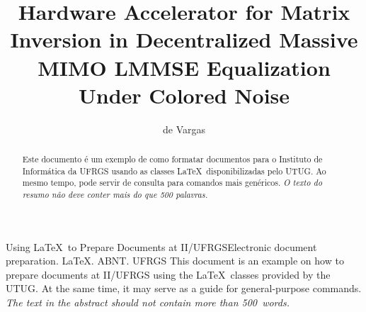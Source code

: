 \documentclass[ecp,tc,english]{iiufrgs}
\title{Hardware Accelerator for Matrix Inversion in Decentralized Massive MIMO LMMSE Equalization Under Colored Noise}
\author{de Vargas}{Juliana Rodrigues}
\begin{document}
\maketitle





\begin{abstract}
    Este documento é um exemplo de como formatar documentos para o
    Instituto de Informática da UFRGS usando as classes \LaTeX\
    disponibilizadas pelo UTUG\@. Ao mesmo tempo, pode servir de consulta
    para comandos mais genéricos. \emph{O texto do resumo não deve
      conter mais do que 500 palavras.}
\end{abstract}

\begin{englishabstract}{Using \LaTeX\ to Prepare Documents at II/UFRGS}{Electronic document preparation. \LaTeX. ABNT. UFRGS}
    This document is an example on how to prepare documents at II/UFRGS
    using the \LaTeX\ classes provided by the UTUG\@. At the same time, it
    may serve as a guide for general-purpose commands. \emph{The text in
      the abstract should not contain more than 500~words.}
\end{englishabstract}

\listoffigures

\listoftables
\end{document}
